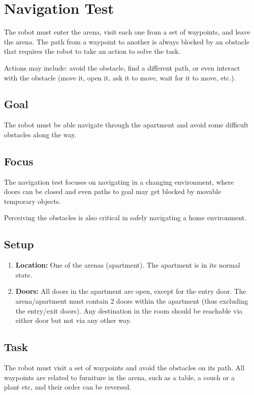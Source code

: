 \section{Navigation Test}

The robot must enter the arena, visit each one from a set of waypoints, and leave the arena. The path from a waypoint to another is always blocked by an obstacle that requires the robot to take an action to solve the task.

Actions may include: avoid the obstacle, find a different path, or even interact with the obstacle (move it, open it, ask it to move, wait for it to move, etc.).

\subsection{Goal}
The robot must be able navigate through the apartment and avoid some difficult obstacles along the way.

\subsection{Focus}
The navigation test focuses on navigating in a changing environment, where doors can be closed and even paths to goal may get blocked by movable temporary objects. 

Perceiving the obstacles is also critical in safely navigating a home environment.

\subsection{Setup}

\begin{enumerate}
\item \textbf{Location:} One of the arenas (apartment). The apartment is in its normal state.
\item \textbf{Doors:} All doors in the apartment are open, except for the entry door. The arena/apartment must contain 2 doors within the apartment (thus excluding the entry/exit doors). Any destination in the room should be reachable via either door but not via any other way.
\end{enumerate}

\subsection{Task}
The robot must visit a set of waypoints and avoid the obstacles on its path. All waypoints are related to furniture in the arena, such as a table, a couch or a plant etc, and their order can be reversed.


